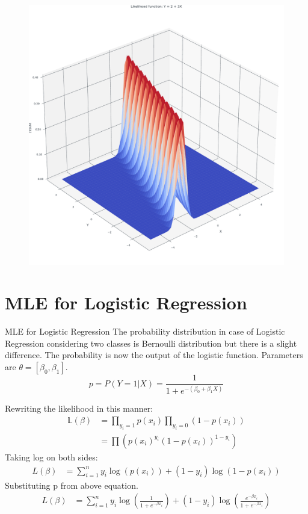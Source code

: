 \documentclass[handout]{beamer}
\begin{document}
\begin{frame}
    \begin{figure}
                \includegraphics[scale=0.35]{../figures/mle/linear_reg.pdf}
    \end{figure}
\end{frame}

\section{MLE for Logistic Regression}
\begin{frame}{MLE for Logistic Regression}
The probability distribution in case of Logistic Regression considering two classes is Bernoulli distribution but there is a slight difference. The probability is now the output of the logistic function.
Parameters are $\theta=[\beta_0,\beta_1]$.
\begin{equation}
p = P(Y=1|X) = \frac{1}{1+e^{-(\beta_0+\beta_1X)}}
\end{equation}


\end{frame}

\begin{frame}
Rewriting the likelihood in this manner:
\begin{align*}
    \mathbb{L}(\beta)&= \prod_{y_i=1}p(x_i)\prod_{y_i=0}(1-p(x_i))\\
    &=\prod\left(p(x_i)^{y_i}(1-p(x_i))^{1-y_i}\right)
\end{align*}
Taking log on both sides:\\
\begin{align*}
    L(\beta) &= \sum_{i=1}^n y_i\log(p(x_i)) + (1-y_i)\log(1-p(x_i))
\end{align*}
Substituting p from above equation. 
\begin{align}
    L(\beta) &= \sum_{i=1}^ny_i\log\left(\frac{1}{1+e^{-\beta x_i}}\right) + (1-y_i)\log\left(\frac{e^{-\beta x_i}}{1+e^{-\beta x_i}}\right)
\end{align}
\end{frame}
\end{document}
